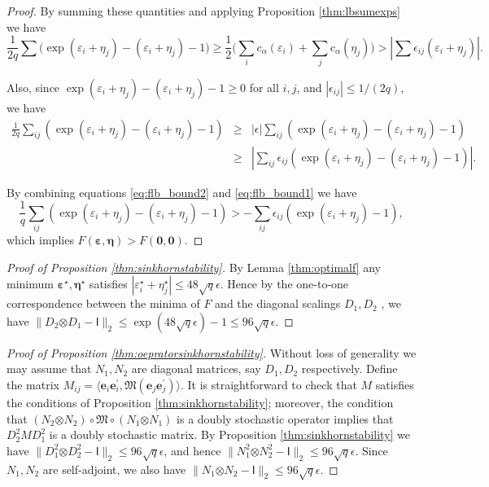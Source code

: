 \documentclass[11pt,letterpaper]{article}
\newcommand{\be}{\mathbf{e}}
\newcommand{\botimes}{\boldsymbol \otimes}
\newcommand{\sfi}{\mathsf{I}}
\begin{document}
\begin{proof}
	
	By summing these quantities and applying Proposition \ref{thm:lbsumexps} we have
	\begin{equation} \label{eq:flb_bound2}
		\frac{1}{2q} \sum \biggl(\exp(\varepsilon_i + \eta_j) - (\varepsilon_i + \eta_j ) - 1 \biggr) \geq \frac{1}{2} \biggl( \sum_{i} c_{\alpha}(\varepsilon_i) + \sum_{j} c_{\alpha}(\eta_j) \biggr) > | \sum \epsilon_{ij} (\varepsilon_i + \eta_j)|.
	\end{equation}
	
	Also, since $ \exp(\varepsilon_i + \eta_j ) -(\varepsilon_i + \eta_j) - 1 \geq 0$ for all $i,j$, and $|\epsilon_{ij}| \leq 1/(2q)$, we have 
	\begin{eqnarray}\label{eq:flb_bound1}
		\frac{1}{2q} \sum_{ij}   (\exp(\varepsilon_i + \eta_j ) -(\varepsilon_i + \eta_j) - 1) & \geq & |\epsilon| \sum_{ij}  (\exp(\varepsilon_i + \eta_j ) -(\varepsilon_i + \eta_j) - 1) \nonumber \\
		& \geq & |\sum_{ij} \epsilon_{ij} (\exp(\varepsilon_i + \eta_j ) -(\varepsilon_i + \eta_j) - 1) | .
	\end{eqnarray}
	
	By combining equations \eqref{eq:flb_bound2} and \eqref{eq:flb_bound1} we have
	\begin{equation*}
		\frac{1}{q} \sum_{ij}   (\exp(\varepsilon_i + \eta_j ) -(\varepsilon_i + \eta_j) - 1) > -\sum_{ij} \epsilon_{ij} (\exp(\varepsilon_i + \eta_j )  - 1),
	\end{equation*}
	which implies $F(\boldsymbol \varepsilon, \boldsymbol \eta) > F(\boldsymbol 0, \boldsymbol 0)$.
\end{proof}

\begin{proof}[Proof of Proposition \ref{thm:sinkhornstability}]
	By Lemma \ref{thm:optimalf} any minimum $\boldsymbol \varepsilon^{\star}, \boldsymbol \eta^{\star}$ satisfies $| \varepsilon_i^{\star} + \eta_j^{\star} | \leq 48 \sqrt{q} \epsilon$.  Hence by the one-to-one correspondence between the minima of $F$ and the diagonal scalings $D_1,D_2$ \cite{Gor:63}, we have $\| D_2 \botimes D_1 - \sfi \|_2 \leq \exp(48 \sqrt{q} \epsilon) -1 \leq 96 \sqrt{q} \epsilon$.
\end{proof}

\begin{proof}[Proof of Proposition \ref{thm:oepratorsinkhornstability}]
	Without loss of generality we may assume that $N_1,N_2$ are diagonal matrices, say $D_1,D_2$ respectively.  Define the matrix $M_{ij} = \langle \be_i \be_i^{\prime}, \mathfrak{M} (\be_j \be_j^{\prime}) \rangle$.  It is straightforward to check that $M$ satisfies the conditions of Proposition \ref{thm:sinkhornstability}; moreover, the condition that $ (N_2 \botimes N_2) \circ \mathfrak{M} \circ (N_1 \botimes N_1) $ is a doubly stochastic operator implies that $D_2^2 M D_1^2$ is a doubly stochastic matrix.  By Proposition \ref{thm:sinkhornstability} we have $\| D_1^2 \botimes D_2^2 - \sfi \|_2 \leq 96 \sqrt{q} \epsilon$, and hence $\| N_1^2 \botimes N_2^2 - \sfi \|_2 \leq 96 \sqrt{q} \epsilon$.  Since $N_1,N_2$ are self-adjoint, we also have $\| N_1 \botimes N_2 - \sfi \|_2 \leq 96 \sqrt{q} \epsilon$.
\end{proof}
\end{document}
